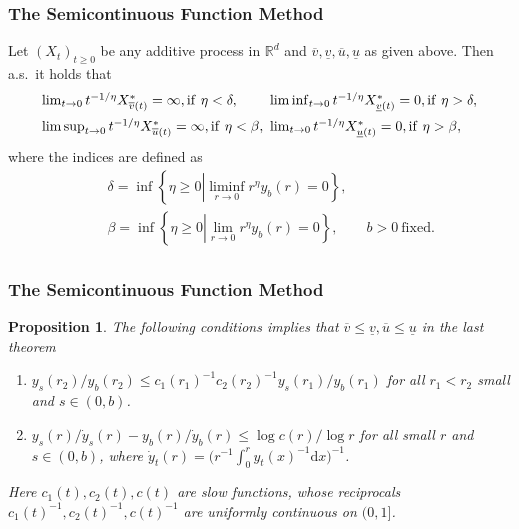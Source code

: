 \documentclass[12pt]{beamer}
\def\RR{\mathbb{R}}
\def\d{\mathrm{d}}
\newtheorem{proposition}{Proposition}
\begin{document}
\begin{frame}
	\frametitle{The Semicontinuous Function Method}
	\begin{theorem}
		\small
		Let $(X_t)_{t\ge0}$ be any additive process in $\RR^d$ and $\overline v,\underline v,\overline u,\underline u$ as given above. Then a.s.~it holds that
		$$
		\begin{array}{ll}
			\lim_{t\to0} t^{-1/\eta}X_{\overline{v}(t)}^*=\infty, \mathrm{if\ }\eta<\delta, & \hspace{-1.2ex} \liminf_{t\to0} t^{-1/\eta}X_{\underline{v}(t)}^*=0, \mathrm{if\ }\eta>\delta, \\[1.5ex]
			\limsup_{t\to0} t^{-1/\eta}X_{\overline{u}(t)}^*=\infty, \mathrm{if\ }\eta<\beta, & \hspace{-1.2ex} \lim_{t\to0} t^{-1/\eta}X_{\underline{u}(t)}^*=0, \mathrm{if\ }\eta>\beta, 
		\end{array}
		$$
		where the indices are defined as
		\vspace{-1ex}
		\begin{eqnarray*}
			& & \delta=\inf\left\{ \eta\ge0\left|\liminf_{r\to0}r^\eta y_b(r)=0\right. \right\},\\
			& & \beta=\inf\left\{ \eta\ge0\left|\lim_{r\to0}r^\eta y_b(r)=0\right. \right\}, \qquad b>0 \mathrm{\ fixed}.\\
		\end{eqnarray*}
	\end{theorem}
\end{frame}
\begin{frame}[label=semicontinuous]
	\frametitle{The Semicontinuous Function Method}
	\begin{proposition}
		The following conditions implies that $\overline v\le\underline v,\overline u\le\underline u$ in the last theorem 
		\begin{enumerate}
			\item[(1)] $y_s(r_2)/y_b(r_2)\le c_1(r_1)^{-1}c_2(r_2)^{-1}y_s(r_1)/y_b(r_1)$ for all $r_1<r_2$ small and $s\in(0,b)$. \\[1ex]
			\item[(2)] $y_s(r)/\dot y_s(r)-y_b(r)/\dot y_b(r)\le\log c(r)/\log r$ for all small $r$ and $s\in(0,b)$, where $\dot y_t(r)=\big(r^{-1}\int_0^r y_t(x)^{-1}\d x\big)^{-1}$. \\[1.5ex]
		\end{enumerate}
		Here $c_1(t),c_2(t),c(t)$ are slow functions, whose reciprocals $c_1(t)^{-1},c_2(t)^{-1},c(t)^{-1}$ are uniformly continuous on $(0,1]$.
	\end{proposition}
\end{frame}
\end{document}
